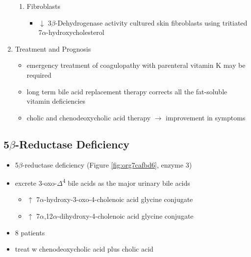 \documentclass{scrartcl}
\begin{document}
\begin{enumerate}
\begin{enumerate}
\item Fibroblasts
\label{sec:orga18c8e9}
\begin{itemize}
\item \(\downarrow\) 3\(\beta\)-Dehydrogenase activity cultured skin fibroblasts using
tritiated 7\(\alpha\)-hydroxycholesterol
\end{itemize}
\end{enumerate}

\item Treatment and Prognosis
\label{sec:org36ec613}
\begin{itemize}
\item emergency treatment of coagulopathy with parenteral vitamin K may be required
\item long term bile acid replacement therapy corrects all the fat-soluble
vitamin deficiencies

\item cholic and chenodeoxycholic acid therapy \(\to\) improvement in symptoms
\end{itemize}
\end{enumerate}

\subsection{5\(\beta\)-Reductase Deficiency}
\label{sec:orgc1092f8}
\begin{itemize}
\item 5\(\beta\)-reductase deficiency (Figure \ref{fig:org7cafbd6}, enzyme 3)
\item excrete 3-oxo-\(\Delta\)\textsuperscript{4} bile acids as the major urinary bile acids
\begin{itemize}
\item \(\uparrow\) 7\(\alpha\)-hydroxy-3-oxo-4-cholenoic acid glycine conjugate
\item \(\uparrow\) 7\(\alpha\),12\(\alpha\)-dihydroxy-4-cholenoic acid glycine conjugate
\end{itemize}
\item 8 patients
\item treat w chenodeoxycholic acid plus cholic acid
\end{itemize}
\end{document}
